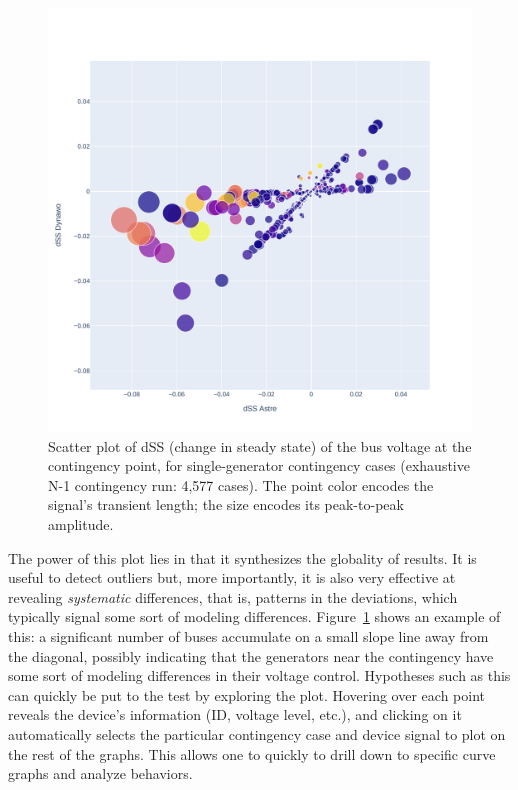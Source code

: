 \documentclass[conference]{IEEEtran}
\begin{document}
\begin{figure}
  \centering
  \includegraphics[width=\columnwidth]{figs/Ubus_dSS_GENS_20210211-0930_moreT600}
  \caption{Scatter plot of dSS (change in steady state) of the bus
    voltage at the contingency point, for single-generator contingency
    cases (exhaustive N-1 contingency run: 4,577 cases). The point
    color encodes the signal's transient length; the size encodes its
    peak-to-peak amplitude.}
  \label{fig:bubbleplot1}
\end{figure}

The power of this plot lies in that it synthesizes the globality of
results.  It is useful to detect outliers but, more importantly, it is
also very effective at revealing \emph{systematic} differences, that
is, patterns in the deviations, which typically signal some sort of
modeling differences. Figure~\ref{fig:bubbleplot1} shows an example of
this: a significant number of buses accumulate on a small slope line
away from the diagonal, possibly indicating that the generators near
the contingency have some sort of modeling differences in their
voltage control. Hypotheses such as this can quickly be put to the
test by exploring the plot. Hovering over each point reveals the
device's information (ID, voltage level, etc.), and clicking on it
automatically selects the particular contingency case and device
signal to plot on the rest of the graphs. This allows one to quickly
to drill down to specific curve graphs and analyze behaviors.
\end{document}
